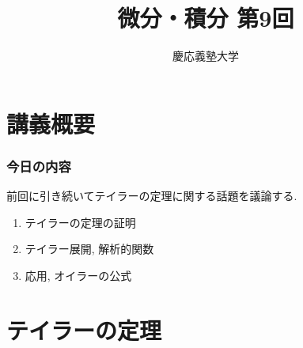 \documentclass[dvipdfmx,cjk,10.2pt]{beamer}
\theoremstyle{definition}
\begin{document}
\title{微分・積分 第9回} 
\author{慶応義塾大学}            %
\date{}



\begin{frame}                  %
\titlepage                     %
\end{frame}








\section{講義概要}


\begin{frame}
\frametitle{今日の内容}


前回に引き続いてテイラーの定理に関する話題を議論する. 
\begin{enumerate}
\item テイラーの定理の証明
\item テイラー展開, 解析的関数
\item 応用, オイラーの公式
\end{enumerate} 



\end{frame}







\section{テイラーの定理}
\end{document}

